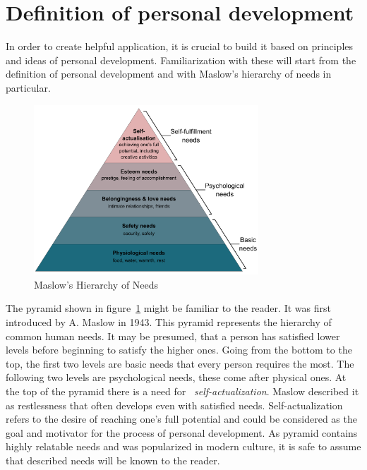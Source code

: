 
\section{Definition of personal development}\label{sec:definition-of-personal-development}

In order to create helpful application, it is crucial to build it based on principles and ideas of personal development.
Familiarization with these will start from the definition of personal development and with Maslow's hierarchy of needs in particular.

\begin{figure}[h]
    \includegraphics[width=0.75\textwidth]{images/maslows}
    \caption{Maslow's Hierarchy of Needs~\cite{maslow-pyramid}}
    \label{fig:maslow-pyramid}
\end{figure}

The pyramid shown in figure~\ref{fig:maslow-pyramid} might be familiar to the reader.
It was first introduced by A. Maslow in 1943.\cite{maslow-motivation}
This pyramid represents the hierarchy of common human needs.
It may be presumed, that a person has satisfied lower levels before beginning to satisfy the higher ones.
Going from the bottom to the top, the first two levels are basic needs that every person requires the most.
The following two levels are psychological needs, these come after physical ones.
At the top of the pyramid there is a need for ~\textit{self-actualization}.
Maslow described it as restlessness that often develops even with satisfied needs.
Self-actualization refers to the desire of reaching one's full potential and could be considered as the goal and motivator for the process of personal development.
As pyramid contains highly relatable needs and was popularized in modern culture, it is safe to assume that described needs will be known to the reader.

